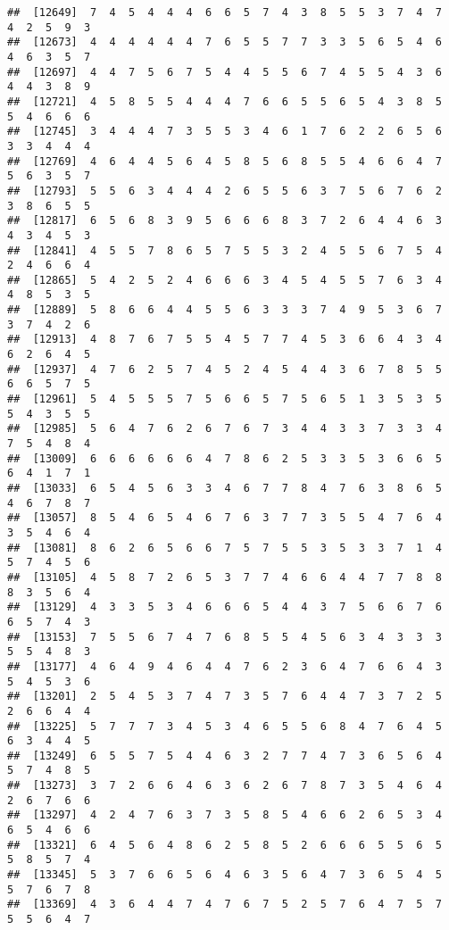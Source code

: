 \documentclass[
]{book}
\begin{document}
\begin{verbatim}
##  [12649]  7  4  5  4  4  4  6  6  5  7  4  3  8  5  5  3  7  4  7  4  2  5  9  3
##  [12673]  4  4  4  4  4  4  7  6  5  5  7  7  3  3  5  6  5  4  6  4  6  3  5  7
##  [12697]  4  4  7  5  6  7  5  4  4  5  5  6  7  4  5  5  4  3  6  4  4  3  8  9
##  [12721]  4  5  8  5  5  4  4  4  7  6  6  5  5  6  5  4  3  8  5  5  4  6  6  6
##  [12745]  3  4  4  4  7  3  5  5  3  4  6  1  7  6  2  2  6  5  6  3  3  4  4  4
##  [12769]  4  6  4  4  5  6  4  5  8  5  6  8  5  5  4  6  6  4  7  5  6  3  5  7
##  [12793]  5  5  6  3  4  4  4  2  6  5  5  6  3  7  5  6  7  6  2  3  8  6  5  5
##  [12817]  6  5  6  8  3  9  5  6  6  6  8  3  7  2  6  4  4  6  3  4  3  4  5  3
##  [12841]  4  5  5  7  8  6  5  7  5  5  3  2  4  5  5  6  7  5  4  2  4  6  6  4
##  [12865]  5  4  2  5  2  4  6  6  6  3  4  5  4  5  5  7  6  3  4  4  8  5  3  5
##  [12889]  5  8  6  6  4  4  5  5  6  3  3  3  7  4  9  5  3  6  7  3  7  4  2  6
##  [12913]  4  8  7  6  7  5  5  4  5  7  7  4  5  3  6  6  4  3  4  6  2  6  4  5
##  [12937]  4  7  6  2  5  7  4  5  2  4  5  4  4  3  6  7  8  5  5  6  6  5  7  5
##  [12961]  5  4  5  5  5  7  5  6  6  5  7  5  6  5  1  3  5  3  5  5  4  3  5  5
##  [12985]  5  6  4  7  6  2  6  7  6  7  3  4  4  3  3  7  3  3  4  7  5  4  8  4
##  [13009]  6  6  6  6  6  6  4  7  8  6  2  5  3  3  5  3  6  6  5  6  4  1  7  1
##  [13033]  6  5  4  5  6  3  3  4  6  7  7  8  4  7  6  3  8  6  5  4  6  7  8  7
##  [13057]  8  5  4  6  5  4  6  7  6  3  7  7  3  5  5  4  7  6  4  3  5  4  6  4
##  [13081]  8  6  2  6  5  6  6  7  5  7  5  5  3  5  3  3  7  1  4  5  7  4  5  6
##  [13105]  4  5  8  7  2  6  5  3  7  7  4  6  6  4  4  7  7  8  8  8  3  5  6  4
##  [13129]  4  3  3  5  3  4  6  6  6  5  4  4  3  7  5  6  6  7  6  6  5  7  4  3
##  [13153]  7  5  5  6  7  4  7  6  8  5  5  4  5  6  3  4  3  3  3  5  5  4  8  3
##  [13177]  4  6  4  9  4  6  4  4  7  6  2  3  6  4  7  6  6  4  3  5  4  5  3  6
##  [13201]  2  5  4  5  3  7  4  7  3  5  7  6  4  4  7  3  7  2  5  2  6  6  4  4
##  [13225]  5  7  7  7  3  4  5  3  4  6  5  5  6  8  4  7  6  4  5  6  3  4  4  5
##  [13249]  6  5  5  7  5  4  4  6  3  2  7  7  4  7  3  6  5  6  4  5  7  4  8  5
##  [13273]  3  7  2  6  6  4  6  3  6  2  6  7  8  7  3  5  4  6  4  2  6  7  6  6
##  [13297]  4  2  4  7  6  3  7  3  5  8  5  4  6  6  2  6  5  3  4  6  5  4  6  6
##  [13321]  6  4  5  6  4  8  6  2  5  8  5  2  6  6  6  5  5  6  5  5  8  5  7  4
##  [13345]  5  3  7  6  6  5  6  4  6  3  5  6  4  7  3  6  5  4  5  5  7  6  7  8
##  [13369]  4  3  6  4  4  7  4  7  6  7  5  2  5  7  6  4  7  5  7  5  5  6  4  7

\end{verbatim}
\end{document}
